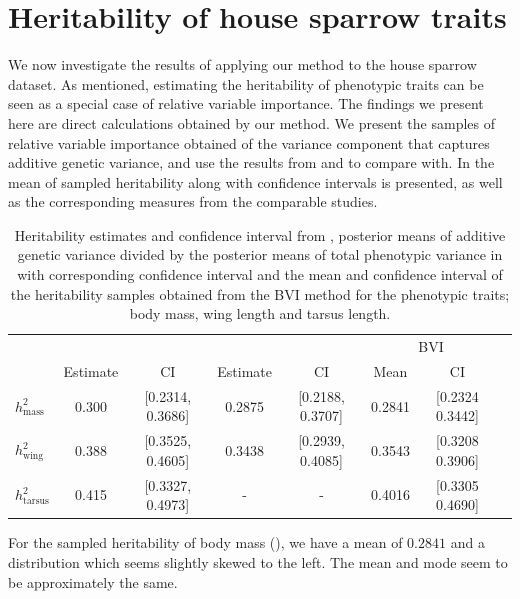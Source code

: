 \section{Heritability of house sparrow traits}
We now investigate the results of applying our method to the house sparrow dataset. As mentioned, estimating the heritability of phenotypic traits can be seen as a special case of relative variable importance. The findings we present here are direct calculations obtained by our method. We present the samples of relative variable importance obtained of the variance component that captures additive genetic variance, and use the results from \citet{Silva2017} and \citet{Muff2019Genetic} to compare with. In  the mean of sampled heritability along with confidence intervals is presented, as well as the corresponding measures from the comparable studies.

\begin{table}[ht]
  \centering
  \begin{tabular}{lccccccc}
  \toprule
   & \multicolumn{2}{c}{\citet{Silva2017}} & \multicolumn{2}{c}{\citet{Muff2019Genetic}} & \multicolumn{2}{c}{BVI} \\ 
   \cmidrule(lr){2-3} \cmidrule(lr){4-5} \cmidrule(lr){6-7}
   & Estimate & CI & Estimate & CI & Mean & CI \\ 
  \midrule
  $h^2_{\text{mass}}$    & 0.300 & [0.2314, 0.3686] & 0.2875 & [0.2188, 0.3707] & 0.2841 & [0.2324 0.3442] \\
  $h^2_{\text{wing}}$    & 0.388 & [0.3525, 0.4605] & 0.3438 & [0.2939, 0.4085] & 0.3543 & [0.3208 0.3906] \\
  $h^2_{\text{tarsus}}$  & 0.415 & [0.3327, 0.4973] & - & - & 0.4016 & [0.3305 0.4690] \\ 
  \bottomrule
  \end{tabular}
  \caption{Heritability estimates and confidence interval from \citet{Silva2017}, posterior means of additive genetic variance divided by the posterior means of total phenotypic variance in \citet{Muff2019Genetic} with corresponding confidence interval and the mean and confidence interval of the heritability samples obtained from the BVI method for the phenotypic traits; body mass, wing length and tarsus length.}
  \label{tab:summary_heritability}
\end{table}

For the sampled heritability of body mass (), we have a mean of $0.2841$ and a distribution which seems slightly skewed to the left. The mean and mode seem to be approximately the same. 

